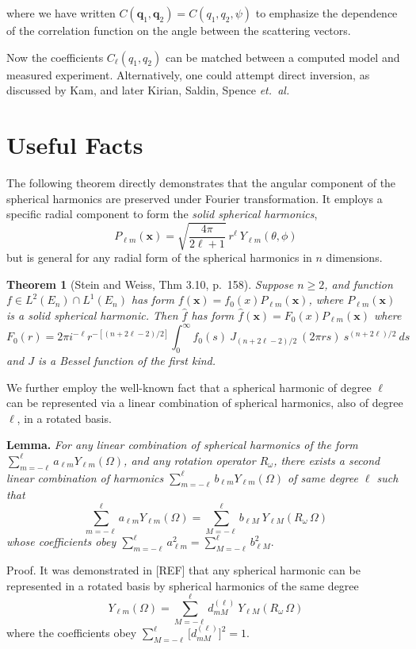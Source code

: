 \documentclass[aps,prl,preprint,groupedaddress]{revtex4-1}
\def\*#1{\mathbf{#1}}
\begin{document}
where we have written $C( \*q_1, \*q_2 ) = C( q_1, q_2, \psi )$ to emphasize the dependence of the correlation function on the angle between the scattering vectors.

Now the coefficients $C_\ell (q_1, q_2)$ can be matched between a computed model and measured experiment. Alternatively, one could attempt direct inversion, as discussed by Kam, and later Kirian, Saldin, Spence \textit{et.~al.}



 \section{Useful Facts}
 
The following theorem directly demonstrates that the angular component of the spherical harmonics are preserved under Fourier transformation. It employs a specific radial component to form the \textit{solid spherical harmonics},
\[
P_{\ell m}(\*x) = \sqrt{ \frac{4 \pi}{2 \ell +1} } \> r^\ell \> Y_{\ell m} (\theta, \phi)
\]
but is general for any radial form of the spherical harmonics in $n$ dimensions.
 
\textbf{Theorem 1} (Stein and Weiss, Thm 3.10, p.~158).
\textit{Suppose $n \geq 2$, and function $f \in L^2(E_n) \cap  L^1(E_n)$ has form $f(\*x) = f_0(x)P_{\ell m}(\*x)$, where $P_{\ell m}(\*x)$ is a solid spherical harmonic. Then $\hat{f}$ has form $\hat{f}(\*x) = F_0(x)P_{\ell m}(\*x)$ where
 \[
 F_0(r) = 2 \pi i^{-\ell} r^{-[(n+2\ell-2)/2]} \int_0^{\infty} f_0(s) \> J_{(n+2\ell-2) / 2} \> (2 \pi r s) \> s^{(n+2\ell)/2} \> ds
 \]
 and $J$ is a Bessel function of the first kind.}
 
We further employ the well-known fact that a spherical harmonic of degree $\ell$ can be represented via a linear combination of spherical harmonics, also of degree $\ell$, in a rotated basis.

\textbf{Lemma.}
\textit{For any linear combination of spherical harmonics of the form $\sum_{m=-\ell}^\ell a_{\ell m} Y_{\ell m} (\Omega)$, and any rotation operator $R_\omega$, there exists a second linear combination of harmonics $\sum_{m=-\ell}^\ell b_{\ell m} Y_{\ell m} (\Omega)$ of same degree $\ell$ such that
\[
\sum_{m=-\ell}^\ell a_{\ell m} Y_{\ell m} (\Omega) = \sum_{M=-\ell}^{\ell} b_{\ell M} \> Y_{\ell M} ( R_\omega \, \Omega )
\]
whose coefficients obey
$\sum_{m=-\ell}^\ell a_{\ell m}^2 = \sum_{M=-\ell}^\ell b_{\ell M}^2$}.

Proof. It was demonstrated in [REF] that any spherical harmonic can be represented in a rotated basis by spherical harmonics of the same degree 
\[
 Y_{\ell m} (\Omega) = \sum_{M=-\ell}^{\ell} d^{(\ell)}_{mM} \> Y_{\ell M} ( R_\omega \, \Omega )
\]
where the coefficients obey $\sum_{M=-\ell}^{\ell} \big[ d^{(\ell)}_{mM} \big]^2 = 1$.
\end{document}
